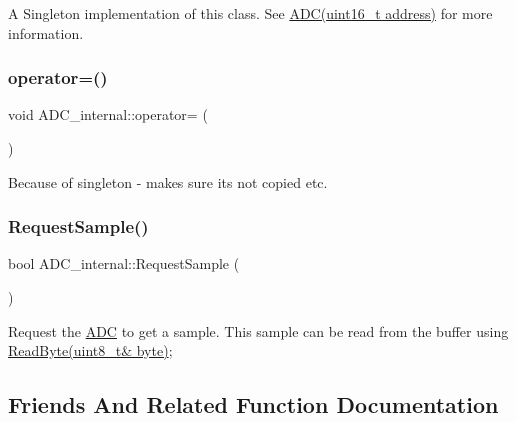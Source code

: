 A Singleton implementation of this class. See \hyperlink{class_a_d_c}{A\+D\+C(uint16\+\_\+t address)} for more information. \hypertarget{class_a_d_c__internal_a07f6b3f9703f2a5f6815904e371bb124}{}\label{class_a_d_c__internal_a07f6b3f9703f2a5f6815904e371bb124} 
\subsubsection{\texorpdfstring{operator=()}{operator=()}}
{\footnotesize\ttfamily void A\+D\+C\+\_\+internal\+::operator= (\begin{DoxyParamCaption}\item[{const \hyperlink{class_a_d_c__internal}{A\+D\+C\+\_\+internal} \&}]{ }\end{DoxyParamCaption})\hspace{0.3cm}{\ttfamily [delete]}}

Because of singleton -\/ makes sure its not copied etc. \hypertarget{class_a_d_c__internal_accd9d981273a75e739f16232196f0d5e}{}\label{class_a_d_c__internal_accd9d981273a75e739f16232196f0d5e} 
\subsubsection{\texorpdfstring{Request\+Sample()}{RequestSample()}}
{\footnotesize\ttfamily bool A\+D\+C\+\_\+internal\+::\+Request\+Sample (\begin{DoxyParamCaption}{ }\end{DoxyParamCaption})}

Request the \hyperlink{class_a_d_c}{A\+DC} to get a sample. This sample can be read from the buffer using \hyperlink{class_stream_a6db4180f5834073f992608b856bddca2}{Read\+Byte(uint8\+\_\+t\& byte)}; 

\subsection{Friends And Related Function Documentation}
\hypertarget{class_a_d_c__internal_a7fd45f1c13cbbf59c3e1ce84deca2e01}{}\label{class_a_d_c__internal_a7fd45f1c13cbbf59c3e1ce84deca2e01} 
